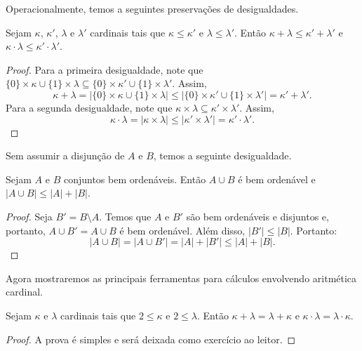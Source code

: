 Operacionalmente, temos a seguintes preservações de desigualdades.
\begin{lemma}
Sejam $\kappa$, $\kappa'$, $\lambda$ e $\lambda'$ cardinais tais que $\kappa \leq \kappa'$ e $\lambda \leq \lambda'$.
Então $\kappa + \lambda \leq \kappa' + \lambda'$ e $\kappa \cdot \lambda \leq \kappa' \cdot \lambda'$.
\end{lemma}
\begin{proof}
    Para a primeira desigualdade, note que $\{0\}\times \kappa \cup \{1\}\times \lambda \subseteq \{0\}\times \kappa' \cup \{1\}\times \lambda'$.
    Assim,
    \[
    \kappa + \lambda = |\{0\}\times \kappa \cup \{1\}\times \lambda| \leq |\{0\}\times \kappa' \cup \{1\}\times \lambda'| = \kappa' + \lambda'.
    \]
    Para a segunda desigualdade, note que $\kappa \times \lambda \subseteq \kappa' \times \lambda'$.
    Assim,
    \[
    \kappa \cdot \lambda = |\kappa \times \lambda| \leq |\kappa' \times \lambda'| = \kappa' \cdot \lambda'.
    \]
\end{proof}

Sem assumir a disjunção de $A$ e $B$, temos a seguinte desigualdade.
\begin{lemma}
Sejam $A$ e $B$ conjuntos bem ordenáveis.
Então $A\cup B$ é bem ordenável e $|A\cup B|\leq |A|+|B|$.
\end{lemma}
\begin{proof}
    Seja $B'=B\setminus A$.
    Temos que $A$ e $B'$ são bem ordenáveis e disjuntos e, portanto, $A\cup B'=A\cup B$ é bem ordenável.
    Além disso, $|B'|\leq |B|$.
    Portanto:
    \[
    |A\cup B| = |A\cup B'| = |A| + |B'| \leq |A| + |B|.
    \]
\end{proof}

Agora mostraremos as principais ferramentas para cálculos envolvendo aritmética cardinal.

\begin{lemma}\label{lem:aritmeticaCardinalComutativa}
    Sejam $\kappa$ e $\lambda$ cardinais tais que $2\leq \kappa$ e $2\leq \lambda$.
    Então $\kappa + \lambda=\lambda+\kappa$ e $\kappa \cdot \lambda=\lambda \cdot \kappa$.
\end{lemma}
\begin{proof}
    A prova é simples e será deixada como exercício ao leitor.
\end{proof}

